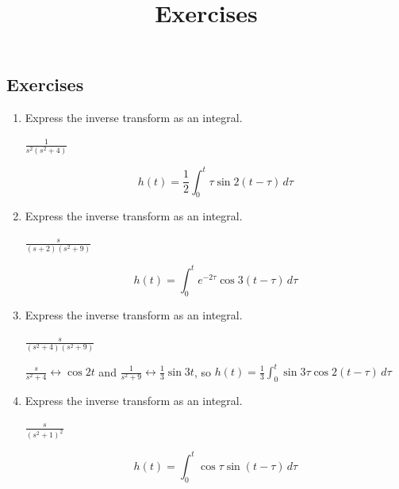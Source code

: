 \documentclass{ximera}
\title{Exercises} \license{CC BY-NC-SA 4.0}
\begin{document}
\begin{abstract}
\end{abstract}
\maketitle

\begin{onlineOnly}
\section*{Exercises}
\end{onlineOnly}

\begin{problem}\label{exer:8.6.1}

\begin{enumerate}

\item Express the inverse transform as an integral.  

$\frac{1}{s^2(s^2+4)}$

\begin{solution}
    $$h(t)= \frac{1}{2}\int_0^t \tau \sin 2(t-\tau)\,d\tau$$
\end{solution}

\item Express the inverse transform as an integral.

$\frac{s}{(s+2)(s^2+9)}$

\begin{solution}
    $$h(t)= \int_0^t e^{-2\tau} \cos 3(t-\tau)\,d\tau$$
\end{solution}

\item Express the inverse transform as an integral.

$\frac{s}{(s^2+4)(s^2+9)}$

\begin{solution}
   $\frac{s}{s^2+4} \leftrightarrow \cos 2t$ and $\frac{1}{s^2+9}\leftrightarrow \frac{1}{3}\sin 3t$, so $h(t)= \frac{1}{3}\int_0^t \sin 3\tau\cos 2(t-\tau)\,d\tau$

\end{solution}

\item Express the inverse transform as an integral.

$\frac{s}{(s^2+1)^2}$

\begin{solution}
    $$h(t) = \int_0^t \cos \tau \sin (t-\tau)\,d\tau$$
\end{solution}


\end{enumerate}
\end{problem}
\end{document}
